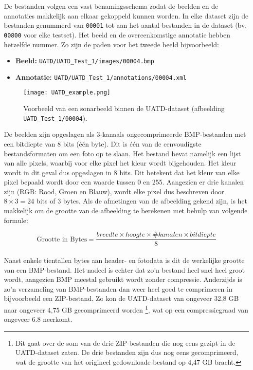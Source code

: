 De bestanden volgen een vast benamingsschema zodat de beelden en de annotaties makkelijk aan elkaar gekoppeld kunnen worden. In elke dataset zijn de bestanden genummerd van \texttt{00001} tot aan het aantal bestanden in de dataset (bv. \texttt{00800} voor elke testset). Het beeld en de overeenkomstige annotatie hebben hetzelfde nummer. Zo zijn de paden voor het tweede beeld bijvoorbeeld:

\begin{itemize}
    \item \textbf{Beeld:} \texttt{UATD/UATD\_Test\_1/images/00004.bmp}
    \item \textbf{Annotatie:} \texttt{UATD/UATD\_Test\_1/annotations/00004.xml}
\end{itemize}

\begin{figure}[H]
    \centering
    \texttt{[image: UATD\_example.png]}
    \caption[UATD afbeelding.]{\label{fig:uatd_image}Voorbeeld van een sonarbeeld binnen de UATD-dataset (afbeelding \texttt{UATD\_Test\_1/00004}). \autocite{Xie_2022}}
\end{figure}

De beelden zijn opgeslagen als 3-kanaals ongecomprimeerde BMP-bestanden met een bitdiepte van 8 bits (één byte). Dit is één van de eenvoudigste bestandsformaten om een foto op te slaan. Het bestand bevat namelijk een lijst van alle pixels, waarbij voor elke pixel het kleur wordt bijgehouden. Het kleur wordt in dit geval dus opgeslagen in 8 bits. Dit betekent dat het kleur van elke pixel bepaald wordt door een waarde tussen 0 en 255. Aangezien er drie kanalen zijn (RGB: Rood, Groen en Blauw), wordt elke pixel dus beschreven door $8 \times 3 = 24$ bits of 3 bytes. Als de afmetingen van de afbeelding gekend zijn, is het makkelijk om de grootte van de afbeelding te berekenen met behulp van volgende formule:

$$
\text{Grootte in Bytes} = \frac{breedte \times hoogte \times \#kanalen \times bitdiepte}{8}
$$ \\

Naast enkele tientallen bytes aan header- en fotodata is dit de werkelijke grootte van een BMP-bestand. Het nadeel is echter dat zo'n bestand heel snel heel groot wordt, aangezien BMP meestal gebruikt wordt zonder compressie. Anderzijds is zo'n verzameling van BMP-bestanden dan weer heel goed te comprimeren in bijvoorbeeld een ZIP-bestand. Zo kon de UATD-dataset van ongeveer 32,8 GB naar ongeveer 4,75 GB gecomprimeerd worden \footnote{Dit gaat over de som van de drie ZIP-bestanden die nog eens gezipt in de UATD-dataset zaten. De drie bestanden zijn dus nog eens gecomprimeerd, wat de grootte van het origineel gedownloade bestand op 4,47 GB bracht.}, wat op een compressiegraad van ongeveer 6.8 neerkomt. \autocite{Bourke_1998}


